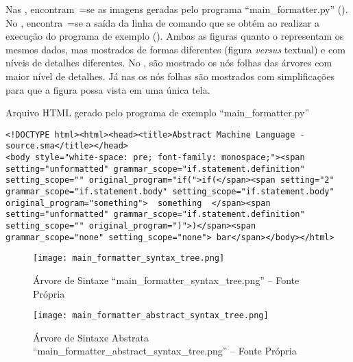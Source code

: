 Nas ,
encontram~=se as imagens geradas pelo programa ``main\_formatter.py'' ().
No ,
encontra~=se a saída da linha de comando que se obtém ao realizar a execução do programa de exemplo ().
Ambas as figuras  quanto o  representam os mesmos dados,
mas mostrados de formas diferentes (figura \textit{versus} textual) e
com níveis de detalhes diferentes.
No ,
são mostrado os nós folhas das árvores com maior nível de detalhes.
Já nas  os nós folhas são mostrados com simplificações para que a figura possa vista em uma única tela.
\begin{code}
\caption{Arquivo HTML gerado pelo programa de exemplo ``main\_formatter.py''}
\label{MainFormatterHtml}
\begin{verbatim}
<!DOCTYPE html><html><head><title>Abstract Machine Language - source.sma</title></head>
<body style="white-space: pre; font-family: monospace;"><span setting="unformatted" grammar_scope="if.statement.definition" setting_scope="" original_program="if(">if(</span><span setting="2" grammar_scope="if.statement.body" setting_scope="if.statement.body" original_program="something">  something  </span><span setting="unformatted" grammar_scope="if.statement.definition" setting_scope="" original_program=")">)</span><span grammar_scope="none" setting_scope="none"> bar</span></body></html>
\end{verbatim}
\end{code}

\begin{figure}[h]
\centering
\texttt{[image: main\_formatter\_syntax\_tree.png]}
\caption[Árvore de Sintaxe ``main\_formatter\_syntax\_tree.png'']
{Árvore de Sintaxe ``main\_formatter\_syntax\_tree.png'' -- Fonte Própria}
\label{MainFormatterSyntaxTree}
\end{figure}

\begin{figure}[h]
\centering
\texttt{[image: main\_formatter\_abstract\_syntax\_tree.png]}
\caption[Árvore de Sintaxe Abstrata ``main\_formatter\_abstract\_syntax\_tree.png'']
{Árvore de Sintaxe Abstrata ``main\_formatter\_abstract\_syntax\_tree.png'' -- Fonte Própria}
\label{MainFormatterAbstractSyntaxTree}
\end{figure}


